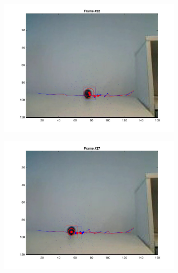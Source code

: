 \documentclass{ethz_report}
\begin{document}
\begin{figure}[h]
\begin{subfigure}[b]{.25\textwidth}
        \includegraphics[width=1\linewidth]{images/video3_bins_high_21}
    \end{subfigure}%
    \begin{subfigure}[b]{.25\textwidth}
        \centering
        \includegraphics[width=1\linewidth]{images/video3_bins_high_26}
    \end{subfigure}%
    \begin{subfigure}[b]{.25\textwidth}
        \centering

\end{subfigure}
\end{figure}
\end{document}
